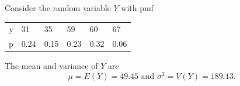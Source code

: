   
  
  
  
  



\begin{frame}
  \begin{block}{\example}
    Consider the random variable $Y$ with pmf
    \begin{center}
\begin{table}[ht]
\centering
\begin{tabular}{rlllll}
  \hline
  \hline
y & 31 & 35 & 59 & 60 & 67 \\ 
  p & 0.24 & 0.15 & 0.23 & 0.32 & 0.06 \\ 
   \hline
\end{tabular}
\end{table}


    \end{center}
  \end{block}

  The mean and variance of $Y$ are
  \[
    \mu = E(Y)=49.45 \mbox{ and } \sigma^2=V(Y)=189.13.
  \]

\end{frame}



